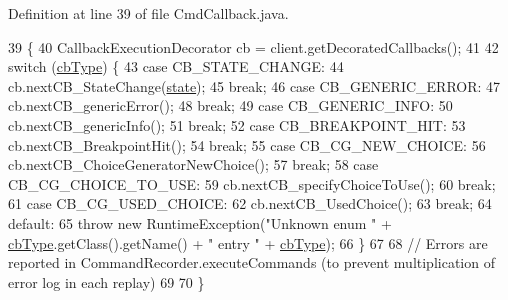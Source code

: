 Definition at line 39 of file Cmd\+Callback.\+java.


\begin{DoxyCode}
39                                                                                                            
                    \{
40     CallbackExecutionDecorator cb = client.getDecoratedCallbacks();
41 
42     \textcolor{keywordflow}{switch} (\hyperlink{classgov_1_1nasa_1_1jpf_1_1inspector_1_1client_1_1commands_1_1_cmd_callback_a3fdc749dfa288c4bd4a72b5235539e91}{cbType}) \{
43     \textcolor{keywordflow}{case} CB\_STATE\_CHANGE:
44       cb.nextCB\_StateChange(\hyperlink{classgov_1_1nasa_1_1jpf_1_1inspector_1_1client_1_1commands_1_1_cmd_callback_a565db0f21a577f23952aaa47706b7cbd}{state});
45       \textcolor{keywordflow}{break};
46     \textcolor{keywordflow}{case} CB\_GENERIC\_ERROR:
47       cb.nextCB\_genericError();
48       \textcolor{keywordflow}{break};
49     \textcolor{keywordflow}{case} CB\_GENERIC\_INFO:
50       cb.nextCB\_genericInfo();
51       \textcolor{keywordflow}{break};
52     \textcolor{keywordflow}{case} CB\_BREAKPOINT\_HIT:
53       cb.nextCB\_BreakpointHit();
54       \textcolor{keywordflow}{break};
55     \textcolor{keywordflow}{case} CB\_CG\_NEW\_CHOICE:
56       cb.nextCB\_ChoiceGeneratorNewChoice();
57       \textcolor{keywordflow}{break};
58     \textcolor{keywordflow}{case} CB\_CG\_CHOICE\_TO\_USE:
59       cb.nextCB\_specifyChoiceToUse();
60       \textcolor{keywordflow}{break};
61     \textcolor{keywordflow}{case} CB\_CG\_USED\_CHOICE:
62       cb.nextCB\_UsedChoice();
63       \textcolor{keywordflow}{break};
64     \textcolor{keywordflow}{default}:
65       \textcolor{keywordflow}{throw} \textcolor{keyword}{new} RuntimeException(\textcolor{stringliteral}{"Unknown enum "} + \hyperlink{classgov_1_1nasa_1_1jpf_1_1inspector_1_1client_1_1commands_1_1_cmd_callback_a3fdc749dfa288c4bd4a72b5235539e91}{cbType}.getClass().getName() + \textcolor{stringliteral}{" entry "} + 
      \hyperlink{classgov_1_1nasa_1_1jpf_1_1inspector_1_1client_1_1commands_1_1_cmd_callback_a3fdc749dfa288c4bd4a72b5235539e91}{cbType});
66     \}
67 
68     \textcolor{comment}{// Errors are reported in CommandRecorder.executeCommands (to prevent multiplication of error log in
       each replay)}
69 
70   \}
\end{DoxyCode}
